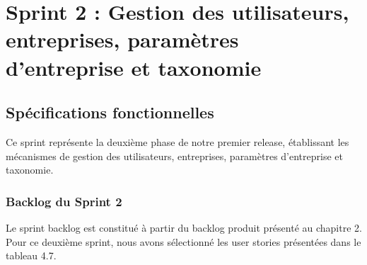 \section{Sprint 2 : Gestion des utilisateurs, entreprises, paramètres d'entreprise et taxonomie}

\subsection{Spécifications fonctionnelles}
\noindent Ce sprint représente la deuxième phase de notre premier release, établissant les mécanismes de gestion des utilisateurs, entreprises, paramètres d'entreprise et taxonomie.

\subsubsection{Backlog du Sprint 2}
\noindent Le sprint backlog est constitué à partir du backlog produit présenté au chapitre 2. Pour ce deuxième sprint, nous avons sélectionné les user stories présentées dans le tableau 4.7.

